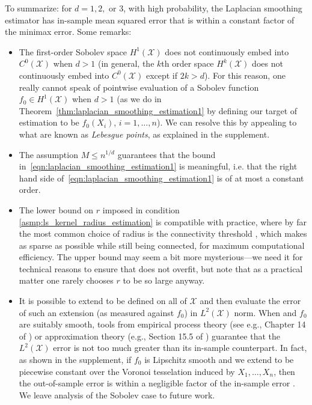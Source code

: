 \documentclass[twoside]{article}
\newcommand{\1}{\mathbf{1}}
\newcommand{\Xset}{\mathcal{X}}
\newcommand{\Leb}{L}
\newcommand{\wh}[1]{\widehat{#1}}
\theoremstyle{definition}
\theoremstyle{remark}
\begin{document}
To summarize: for $d = 1,2,$ or $3$, with high probability, the Laplacian smoothing estimator \smash{$\wh{f}$} has in-sample mean squared error that is within a constant factor of the minimax error. Some remarks:
\begin{itemize}
  \item The first-order Sobolev space $H^1(\Xset)$ does not continuously embed into $C^0(\Xset)$ when $d>1$ (in general, the $k$th order space $H^k(\Xset)$ does not continuously embed into $C^0(\Xset)$ except if $2k>d$). For this reason, one really cannot speak of pointwise evaluation of a Sobolev function $f_0 \in H^1(\Xset)$ when $d>1$ (as we do in Theorem~\ref{thm:laplacian_smoothing_estimation1} by defining our target of estimation to be $f_0(X_i)$, $i=1,\ldots,n$). We can resolve this by appealing to what are known as \emph{Lebesgue points}, as explained in the supplement.
	\item The assumption $M \leq n^{1/d}$ guarantees that the bound in~\eqref{eqn:laplacian_smoothing_estimation1} is meaningful, i.e. that the right hand side of~\eqref{eqn:laplacian_smoothing_estimation1} is of at most a constant order.
	\item The lower bound on $r$ imposed in condition \ref{asmp:ls_kernel_radius_estimation} is compatible with practice, where by far the most common choice of radius is the connectivity threshold , which makes  as sparse as possible while still being connected, for maximum computational efficiency. The upper bound may seem a bit more mysterious---we need it for technical reasons to ensure that \smash{$\wh{f}$} does not overfit, but note that as a practical matter one rarely chooses $r$ to be so large anyway.
	\item It is possible to extend \smash{$\wh{f}$} to be defined on all of $\Xset$ and then evaluate the error of such an extension (as measured against $f_0$) in $\Leb^2(\Xset)$ norm. When \smash{$\wh{f}$} and $f_0$ are suitably smooth, tools from empirical process theory (see e.g., Chapter 14 of \citet{wainwright2019}) or approximation theory (e.g., Section 15.5 of \citet{johnstone2011}) guarantee that the $\Leb^2(\Xset)$ error is not too much greater than its in-sample counterpart. In fact, as shown in the supplement, if $f_0$ is Lipschitz smooth and we extend \smash{$\wh{f}$} to be piecewise constant over the Voronoi tesselation induced by $X_1,\ldots,X_n$, then the out-of-sample error \smash{$\|\wh{f}-f_0\|_{\Leb^2(\Xset)}$} is within a negligible factor of the in-sample error \smash{$\|\wh{f}-f_0\|_n$}. We leave analysis of the Sobolev case to future work.
\end{itemize} 
\end{document}
